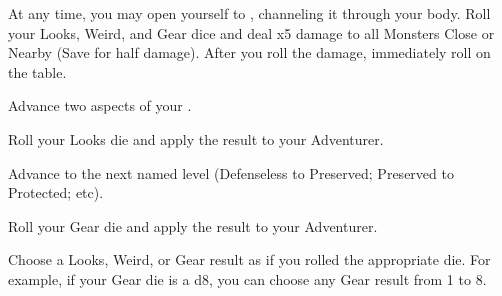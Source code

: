 \begin{multicols*}{2}


At any time, you may open yourself to , channeling it through your body. Roll your Looks, Weird, and Gear dice and deal \SUM x5 damage to all Monsters Close or Nearby (Save for half damage). After you roll the damage, immediately roll on the  table.


Advance two  aspects of your  \DCUP.



Roll your Looks die and apply the result to your Adventurer.

\cbreak


Advance   to the next named level (Defenseless to Preserved; Preserved to Protected; etc).


Roll your Gear die and apply the result to your Adventurer.


Choose a Looks, Weird, or Gear result as if you rolled the appropriate die.  For example, if your Gear die is a d8, you can choose any Gear result from 1 to 8.

\end{multicols*}
